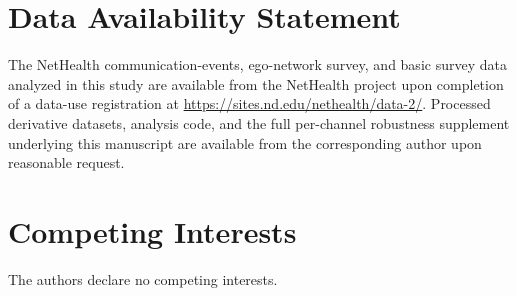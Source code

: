 \documentclass[11pt,letterpaper]{article}
\begin{document}
\section*{Data Availability Statement}
The NetHealth communication-events, ego-network survey, and basic survey data analyzed in this study are available from the NetHealth project upon completion of a data-use registration at \url{https://sites.nd.edu/nethealth/data-2/}. Processed derivative datasets, analysis code, and the full per-channel robustness supplement underlying this manuscript are available from the corresponding author upon reasonable request.

\section*{Competing Interests}
The authors declare no competing interests.
\end{document}

